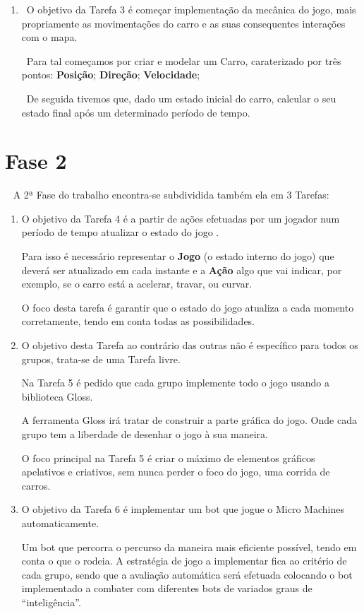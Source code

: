 \documentclass[a4paper]{report} %
\begin{document}
\begin{enumerate}
        \item \ O objetivo da Tarefa 3 é começar implementação da mecânica do jogo, mais propriamente as movimentações do carro e as suas consequentes interações com o mapa.
        \par  \ Para tal começamos por criar e modelar um Carro, caraterizado por três pontos: \textbf{Posição}; \textbf{Direção}; \textbf{Velocidade};
        \par  \ De seguida tivemos que, dado um estado inicial do carro, calcular o seu estado final após um determinado período de tempo. 

    \end{enumerate}

\section{Fase 2}
\label{sec:analisefasee}

\  { A 2ª Fase do trabalho encontra-se subdividida também ela em 3 Tarefas: }

        \begin{enumerate}
            \item O objetivo da Tarefa 4 é a partir de ações efetuadas por um jogador num período de tempo atualizar o estado do jogo . 
            \par Para isso é necessário representar o \textbf{Jogo} (o estado interno do jogo) que deverá ser atualizado em cada instante e a \textbf{Ação} algo que vai indicar, por exemplo, se o carro está a acelerar, travar, ou curvar.
            \par O foco desta tarefa é garantir que o estado do jogo atualiza a cada momento corretamente, tendo em conta todas as possibilidades.
            \item O objetivo desta Tarefa ao contrário das outras não é específico para todos os grupos, trata-se de uma Tarefa livre. 
            \par Na Tarefa 5 é pedido que cada grupo implemente todo o jogo usando a biblioteca Gloss. 
            \par A ferramenta Gloss irá tratar de construir a parte gráfica do jogo. Onde cada grupo tem a liberdade de desenhar o jogo à sua maneira.
            \par O foco principal na Tarefa 5 é criar o máximo de elementos gráficos apelativos e criativos, sem nunca perder o foco do jogo, uma corrida de carros.
            \item O objetivo da Tarefa 6 é implementar um bot que jogue o Micro Machines automaticamente. 
            \par Um bot que percorra o percurso da maneira mais eficiente possível, tendo em conta o que o rodeia. A estratégia de jogo a implementar fica ao critério de cada grupo, sendo que a avaliação automática será efetuada colocando o bot implementado a combater com diferentes bots de variados graus de “inteligência”. 
        \end{enumerate}
\end{document}
